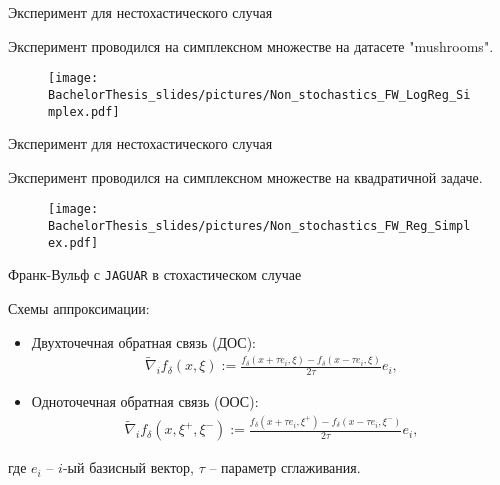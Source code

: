 \documentclass{beamer}
\begin{document}

\begin{frame}{Эксперимент для нестохастического случая}

    Эксперимент проводился на симплексном множестве на датасете "mushrooms".

    \begin{figure}
        \centering
        \texttt{[image: BachelorThesis\_slides/pictures/Non\_stochastics\_FW\_LogReg\_Simplex.pdf]}
    \end{figure}

\end{frame}


\begin{frame}{Эксперимент для нестохастического случая}

    Эксперимент проводился на симплексном множестве на квадратичной задаче.

    \begin{figure}
        \centering
        \texttt{[image: BachelorThesis\_slides/pictures/Non\_stochastics\_FW\_Reg\_Simplex.pdf]}
    \end{figure}

\end{frame}


\begin{frame}{Франк-Вульф с \texttt{JAGUAR} в стохастическом случае}

    Схемы аппроксимации:
    \begin{itemize}
        \item Двухточечная обратная связь (ДОС):
            \begin{align*}
                \widetilde{\nabla}_i f_\delta (x, \xi) :=  \frac{f_\delta (x + \tau e_i, \xi) - f_\delta (x - \tau e_i, \xi)}{2 \tau} e_i,
            \end{align*}
        \item Одноточечная обратная связь (ООС):
            \begin{align*}
                \widetilde{\nabla}_i f_\delta (x, \xi^+, \xi^-) :=  \frac{f_\delta (x + \tau e_i, \xi^+) - f_\delta (x - \tau e_i, \xi^-)}{2 \tau} e_i,
            \end{align*}
    \end{itemize}
    где $e_i$ -- $i$-ый базисный вектор, $\tau$ -- параметр сглаживания.

\end{frame}
\end{document}
